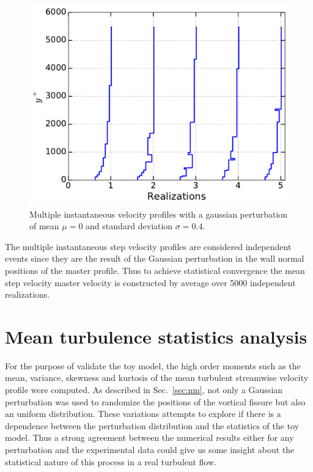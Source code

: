 \documentclass[aps,reprint,amsmath,amssymb,pra,floatfix]{revtex4-1}%
\begin{document}
\begin{figure}[tbh]
\includegraphics[scale=0.45]{figures/multiple_instantaneous_vprof}
\caption{\label{fig:mul_profiles} Multiple instantaneous velocity profiles with a gaussian perturbation of mean $\mu=0$ and standard deviation $\sigma=0.4$.}
\end{figure}

The multiple instantaneous step velocity profiles are considered independent events since they are the result of the Gaussian perturbation in the wall normal positions of the master profile. Thus to achieve statistical convergence the mean step velocity master velocity is constructed by average over 5000 independent realizations.
\section{Mean turbulence statistics analysis}
For the purpose of validate the toy model, the high order moments such as the mean, variance, skewness and kurtosis of the mean turbulent streamwise velocity profile were computed. As described in Sec.~\ref{sec:nm}, not only a Gaussian perturbation was used to randomize the positions of the vortical fissure but also an uniform distribution. These variations attempts to explore if there is a dependence between the perturbation distribution and the statistics of the toy model. Thus a strong agreement between the numerical results either for any perturbation and the experimental data could give us some insight about the statistical nature of this process in a real turbulent flow.
\end{document}
